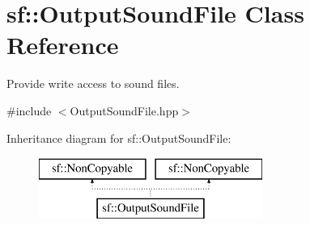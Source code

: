 \hypertarget{classsf_1_1_output_sound_file}{\section{sf\-:\-:Output\-Sound\-File Class Reference}
\label{classsf_1_1_output_sound_file}
}


Provide write access to sound files.  




{\ttfamily \#include $<$Output\-Sound\-File.\-hpp$>$}

Inheritance diagram for sf\-:\-:Output\-Sound\-File\-:\begin{figure}[H]
\begin{center}
\leavevmode
\includegraphics[height=2.000000cm]{classsf_1_1_output_sound_file}
\end{center}
\end{figure}
